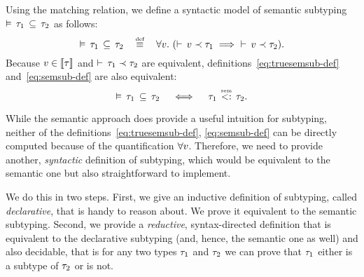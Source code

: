 Using the matching relation, we define a syntactic model of
semantic subtyping $\vDash \, \tau_1 \, \subseteq \, \tau_2$ as follows:
\begin{equation}\label{eq:semsub-def}
\bjsemsub{\ty_1}{\ty_2} \quad \defsign \quad
\forall \vty.\ (\bjmtch{\vty}{\ty_1} \implies\ \bjmtch{\vty}{\ty_2}).
\end{equation}
Because $v \in \llbracket \tau \rrbracket$ and $\vdash \, \tau_1 \prec \tau_2$
are equivalent, definitions~\eqref{eq:truesemsub-def} and~\eqref{eq:semsub-def}
are also equivalent:
\begin{equation}
\bjsemsub{\ty_1}{\ty_2} \quad \iff \quad \bjtruesemsub{\ty_1}{\ty_2}.
\end{equation}


While the semantic approach does provide a useful intuition for subtyping,
neither of the definitions~\eqref{eq:truesemsub-def}, \eqref{eq:semsub-def} 
can be directly computed because of the quantification $\forall v$.
Therefore, we need to provide another, \emph{syntactic} 
definition of subtyping, which would
be equivalent to the semantic one but also straightforward to implement.

We do this in two steps. 
First, we give an inductive definition of subtyping, 
called \emph{declarative}, that is handy to reason about. 
We prove it equivalent to the semantic subtyping.
Second, we provide a \emph{reductive}, syntax-directed definition that is equivalent to the declarative subtyping 
(and, hence, the semantic one as well)
and also decidable, that is for any two types $\tau_1$ and $\tau_2$
we can prove that $\tau_1$ either is a subtype of $\tau_2$ or is not.
